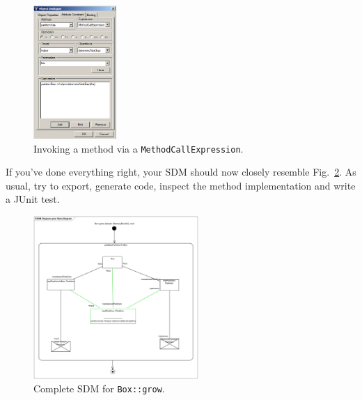 \begin{figure}[htbp]
\begin{center}
  \includegraphics[width=0.28\textwidth]{pics/sdmBilder/grow/sdm66}
  \caption{Invoking a method via a \texttt{MethodCallExpression}.}  
  \label{fig:sdm_grow_4}
\end{center}
\end{figure}

If you've done everything right, your SDM should now closely resemble
Fig.~\ref{fig:sdm_grow_5}.  As usual, try to export, generate code, inspect the
method implementation and write a JUnit test.

\begin{figure}[htbp]
\begin{center}
  \includegraphics[width=0.56\textwidth]{pics/sdmBilder/grow/sdm67}
  \caption{Complete SDM for \texttt{Box::grow}.}  
  \label{fig:sdm_grow_5}
\end{center}
\end{figure}

